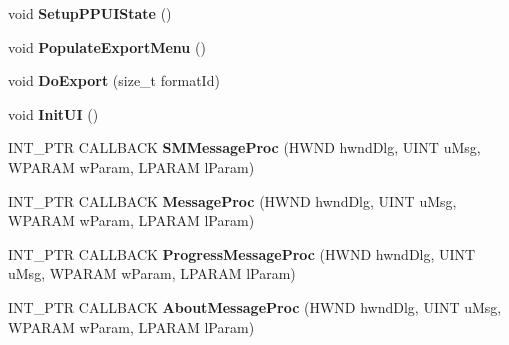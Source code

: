 \begin{DoxyCompactItemize}
\item 
\hypertarget{namespace_assimp_view_a51cc79524f4f86d26a345651131daa41}{void {\bfseries Setup\+P\+P\+U\+I\+State} ()}\label{namespace_assimp_view_a51cc79524f4f86d26a345651131daa41}

\item 
\hypertarget{namespace_assimp_view_af573d891df6819469fcaef14dd2901df}{void {\bfseries Populate\+Export\+Menu} ()}\label{namespace_assimp_view_af573d891df6819469fcaef14dd2901df}

\item 
\hypertarget{namespace_assimp_view_a0032f2a1d7efc6ba8b7c8716976dbe94}{void {\bfseries Do\+Export} (size\+\_\+t format\+Id)}\label{namespace_assimp_view_a0032f2a1d7efc6ba8b7c8716976dbe94}

\item 
\hypertarget{namespace_assimp_view_a8752676716dc993ff28018daaaef5914}{void {\bfseries Init\+U\+I} ()}\label{namespace_assimp_view_a8752676716dc993ff28018daaaef5914}

\item 
\hypertarget{namespace_assimp_view_adf9624cc332b78e37b4b5d2d2c065c30}{I\+N\+T\+\_\+\+P\+T\+R C\+A\+L\+L\+B\+A\+C\+K {\bfseries S\+M\+Message\+Proc} (H\+W\+N\+D hwnd\+Dlg, U\+I\+N\+T u\+Msg, W\+P\+A\+R\+A\+M w\+Param, L\+P\+A\+R\+A\+M l\+Param)}\label{namespace_assimp_view_adf9624cc332b78e37b4b5d2d2c065c30}

\item 
\hypertarget{namespace_assimp_view_a144c97315092d9892226f6496f426ea4}{I\+N\+T\+\_\+\+P\+T\+R C\+A\+L\+L\+B\+A\+C\+K {\bfseries Message\+Proc} (H\+W\+N\+D hwnd\+Dlg, U\+I\+N\+T u\+Msg, W\+P\+A\+R\+A\+M w\+Param, L\+P\+A\+R\+A\+M l\+Param)}\label{namespace_assimp_view_a144c97315092d9892226f6496f426ea4}

\item 
\hypertarget{namespace_assimp_view_af26d959863794f6078183b192e75fbb4}{I\+N\+T\+\_\+\+P\+T\+R C\+A\+L\+L\+B\+A\+C\+K {\bfseries Progress\+Message\+Proc} (H\+W\+N\+D hwnd\+Dlg, U\+I\+N\+T u\+Msg, W\+P\+A\+R\+A\+M w\+Param, L\+P\+A\+R\+A\+M l\+Param)}\label{namespace_assimp_view_af26d959863794f6078183b192e75fbb4}

\item 
\hypertarget{namespace_assimp_view_abe8e9eb85e63bd3efe4f8b8a373db376}{I\+N\+T\+\_\+\+P\+T\+R C\+A\+L\+L\+B\+A\+C\+K {\bfseries About\+Message\+Proc} (H\+W\+N\+D hwnd\+Dlg, U\+I\+N\+T u\+Msg, W\+P\+A\+R\+A\+M w\+Param, L\+P\+A\+R\+A\+M l\+Param)}\label{namespace_assimp_view_abe8e9eb85e63bd3efe4f8b8a373db376}

\end{DoxyCompactItemize}
